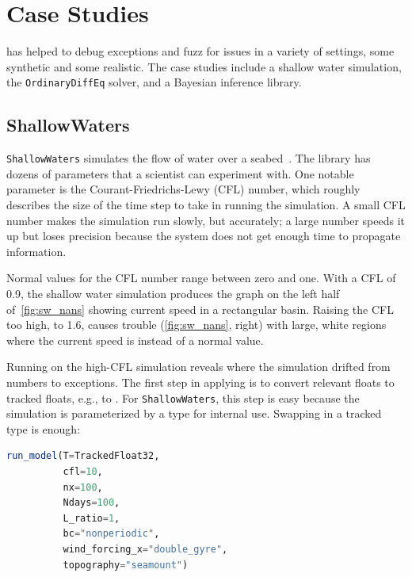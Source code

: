 \documentclass{juliacon}
\begin{document}
\section{Case Studies}
\label{s:casestudies}

\FlowFPX{} has helped to debug exceptions and fuzz for issues in a variety
of settings, some synthetic and some realistic.
The case studies include a shallow water simulation, the
\texttt{OrdinaryDiffEq} solver, and a Bayesian inference library.

\subsection{ShallowWaters}
\label{s:sw}

\texttt{ShallowWaters} simulates the flow of water over a
seabed~\cite{klowerNumberFormatsError2020,klowerPositsAlternativeFloats2019}.
The library has dozens of parameters that a scientist can experiment with.
One notable parameter is the Courant-Friedrichs-Lewy (CFL) number, which roughly describes the size of the time step to take in running the simulation.
A small CFL number makes the simulation run slowly, but accurately; a large number speeds it up but loses precision
because the system does not get enough time to propagate information.

Normal values for the CFL number range between zero and one.
With a CFL of 0.9, the shallow water simulation produces the graph on the left half
of~\cref{fig:sw_nans} showing current speed in a rectangular basin.
Raising the CFL too high, to 1.6, causes trouble
(\cref{fig:sw_nans}, right) with large, white regions where the
current speed is \NaN{} instead of a normal value.

Running \FT{} on the high-CFL simulation reveals where the simulation drifted
from numbers to \NaN{} exceptions.
The first step in applying \FT{} is to convert relevant floats to tracked
floats, e.g.,  to .
For \texttt{ShallowWaters}, this step is easy because the simulation is parameterized by
a \fp{} type for internal use.
Swapping in a tracked type is enough:

\begin{lstlisting}[language = Julia]
run_model(T=TrackedFloat32,
          cfl=10,
          nx=100,
          Ndays=100,
          L_ratio=1,
          bc="nonperiodic",
          wind_forcing_x="double_gyre",
          topography="seamount")
\end{lstlisting}
\end{document}

